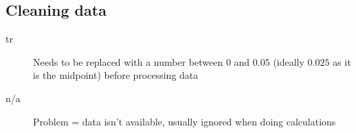 \subsection{Cleaning data}
\begin{description}
    \item[tr] Needs to be replaced with a number between $0$ and $0.05$ (ideally $0.025$ as it is the midpoint) before processing data
    \item[n/a] Problem = data isn't available, usually ignored when doing calculations
\end{description}